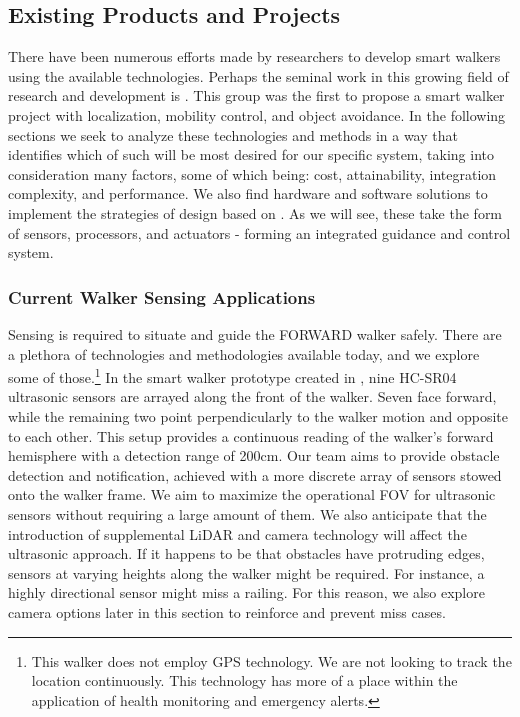 \subsection{Existing Products and Projects}

\noindent There have been numerous efforts made by researchers to develop smart walkers using the available technologies. Perhaps the seminal work in this growing field of research and development is \cite{PAMM}. This group was the first to propose a smart walker project with localization, mobility control, and object avoidance. In the following sections we seek to analyze these technologies and methods in a way that identifies which of such will be most desired for our specific system, taking into consideration many factors, some of which being: cost, attainability, integration complexity, and performance. We also find hardware and software solutions to implement the strategies of design based on \cite{PAMM}. As we will see, these take the form of sensors, processors, and actuators - forming an integrated guidance and control system.\\

\subsubsection{Current Walker Sensing Applications}
\noindent Sensing is required to situate and guide the FORWARD walker safely. There are a plethora of technologies and methodologies available today, and we explore some of those.\footnote{\noindent This walker does not employ GPS technology. We are not looking to track the location continuously. This technology has more of a place within the application of health monitoring and emergency alerts.} In the smart walker prototype created in \cite{Mostofa}, nine HC-SR04 ultrasonic sensors are arrayed along the front of the walker. Seven face forward, while the remaining two point perpendicularly to the walker motion and opposite to each other. This setup provides a continuous reading of the walker's forward hemisphere with a detection range of 200cm. Our team aims to provide obstacle detection and notification, achieved with a more discrete array of sensors stowed onto the walker frame. We aim to maximize the operational FOV for ultrasonic sensors without requiring a large amount of them. We also anticipate that the introduction of supplemental LiDAR and camera technology will affect the ultrasonic approach. If it happens to be that obstacles have protruding edges, sensors at varying heights along the walker might be required. For instance, a highly directional sensor might miss a railing. For this reason, we also explore camera options later in this section to reinforce and prevent miss cases.\\

